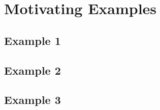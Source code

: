 
\section{Motivating Examples}

\subsection{Example 1}

\subsection{Example 2}

\subsection{Example 3}